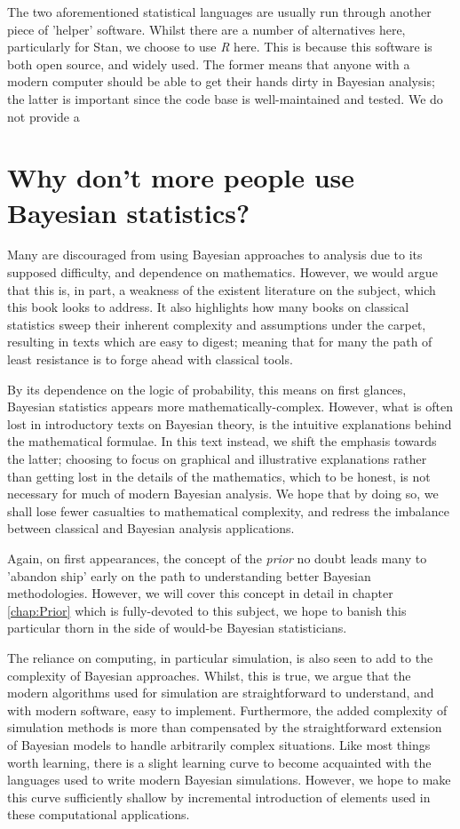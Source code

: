 \documentclass[11pt,fullpage]{book}
\begin{document}
The two aforementioned statistical languages are usually run through another piece of 'helper' software. Whilst there are a number of alternatives here, particularly for Stan, we choose to use \textit{R} here. This is because this software is both open source, and widely used. The former means that anyone with a modern computer should be able to get their hands dirty in Bayesian analysis; the latter is important since the code base is well-maintained and tested. We do not provide a 

\section{Why don't more people use Bayesian statistics?}
Many are discouraged from using Bayesian approaches to analysis due to its supposed difficulty, and dependence on mathematics. However, we would argue that this is, in part, a weakness of the existent literature on the subject, which this book looks to address. It also highlights how many books on classical statistics sweep their inherent complexity and assumptions under the carpet, resulting in texts which are easy to digest; meaning that for many the path of least resistance is to forge ahead with classical tools. 

By its dependence on the logic of probability, this means on first glances, Bayesian statistics appears more mathematically-complex. However, what is often lost in introductory texts on Bayesian theory, is the intuitive explanations behind the mathematical formulae. In this text instead, we shift the emphasis towards the latter; choosing to focus on graphical and illustrative explanations rather than getting lost in the details of the mathematics, which to be honest, is not necessary for much of modern Bayesian analysis. We hope that by doing so, we shall lose fewer casualties to mathematical complexity, and redress the imbalance between classical and Bayesian analysis applications.

Again, on first appearances, the concept of the \textit{prior} no doubt leads many to 'abandon ship' early on the path to understanding better Bayesian methodologies. However, we will cover this concept in detail in chapter \ref{chap:Prior} which is fully-devoted to this subject, we hope to banish this particular thorn in the side of would-be Bayesian statisticians.

The reliance on computing, in particular simulation, is also seen to add to the complexity of Bayesian approaches. Whilst, this is true, we argue that the modern algorithms used for simulation are straightforward to understand, and with modern software, easy to implement. Furthermore, the added complexity of simulation methods is more than compensated by the straightforward extension of Bayesian models to handle arbitrarily complex situations. Like most things worth learning, there is a slight learning curve to become acquainted with the languages used to write modern Bayesian simulations. However, we hope to make this curve sufficiently shallow by incremental introduction of elements used in these computational applications.
\end{document}
